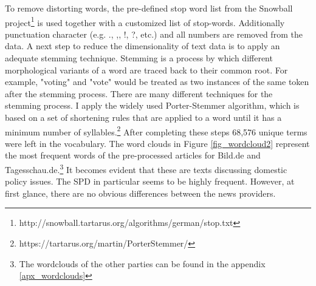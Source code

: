 \documentclass[12pt,a4paper,notitlepage]{article}
\begin{document}
To remove distorting words, the pre-defined stop word list from the Snowball project\footnote{http://snowball.tartarus.org/algorithms/german/stop.txt} is used together with a customized list of stop-words. Additionally punctuation character (e.g. ., ,, !, ?, etc.) and all numbers are removed from the data. A next step to reduce the dimensionality of text data is to apply an adequate stemming technique. Stemming is a process by which different morphological variants of a word are traced back to their common root. For example, "voting" and "vote" would be treated as two instances of the same token after the stemming process. There are many different techniques for the stemming process. I apply the widely used Porter-Stemmer algorithm, which is based on a set of shortening rules that are applied to a word until it has a minimum number of syllables.\footnote{https://tartarus.org/martin/PorterStemmer/} After completing these steps 68,576  unique terms were left in the vocabulary. The word clouds in Figure \ref{fig_wordcloud2} represent the most frequent words of the pre-processed articles for Bild.de and Tagesschau.de.\footnote{The wordclouds of the other parties can be found in the appendix \ref{apx_wordclouds}} It becomes evident that these are texts discussing domestic policy issues. The SPD in particular seems to be highly frequent. However, at first glance, there are no obvious differences between the news providers.  
\end{document}
